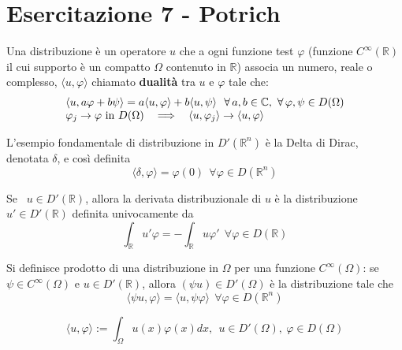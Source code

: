 \chapter{Esercitazione 7 - Potrich}
\ParteEsercizi
\begin{defn}
[Distribuzione] Una distribuzione è un operatore $u$ che a ogni funzione test $\varphi $ (funzione $C^{\infty }(\mathbb{R})$ il cui supporto è un compatto $\Omega $ contenuto in $\mathbb{R}$) associa un numero, reale o complesso, $\langle u,\varphi \rangle $ chiamato \textbf{dualità} tra $u$ e $\varphi $ tale che:
\begin{equation*}
\begin{array}{ l }
\langle u,a\varphi +b\psi \rangle =a\langle u,\varphi \rangle +b\langle u,\psi \rangle \ \ \forall a,b\in \CC  ,\ \forall \varphi ,\psi \in D( \Omega )\\
\varphi _{j}\rightarrow \varphi \ \text{in} \ D( \Omega ) \ \ \implies \ \ \langle u,\varphi _{j} \rangle \rightarrow \langle u,\varphi \rangle 
\end{array}
\end{equation*}
\end{defn}
\begin{rem}
 L'esempio fondamentale di distribuzione in $D'\left(\mathbb{R}^{n}\right)$ è la Delta di Dirac, denotata $\delta $, e così definita
\begin{equation*}
\langle \delta ,\varphi \rangle =\varphi ( 0) \ \ \forall \varphi \in D\left(\mathbb{R}^{n}\right)
\end{equation*}
\end{rem}
\begin{defn}
Se \ $u\in D'(\mathbb{R})$, allora la derivata distribuzionale di $u$ è la distribuzione $u'\in D'(\mathbb{R})$ definita univocamente da
\begin{equation*}
\int _{\mathbb{R}} u'\varphi =-\int _{\mathbb{R}} u\varphi '\ \ \forall \varphi \in D(\mathbb{R})
\end{equation*}
\end{defn}
\begin{defn}
Si definisce prodotto di una distribuzione in $\Omega $ per una funzione $C^{\infty }( \Omega )$: se $\psi \in C^{\infty }( \Omega )$ e $u\in D'(\mathbb{R})$, allora $( \psi u) \in D'( \Omega )$ è la distribuzione tale che
\begin{equation*}
\langle \psi u,\varphi \rangle =\langle u,\psi \varphi \rangle \ \ \forall \varphi \in D\left(\mathbb{R}^{n}\right)
\end{equation*}
\end{defn}
\begin{rem}
\begin{equation*}
\langle u,\varphi \rangle :=\int _{\Omega } u( x) \varphi ( x) dx,\ \ u\in D'( \Omega ) ,\ \varphi \in D( \Omega )
\end{equation*}
\end{rem}
\Esercizio{}

